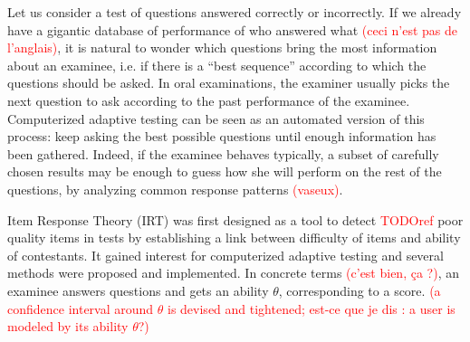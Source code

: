 \documentclass{sig-alternate}
\newcommand\alert[1]{\textcolor{red}{#1}}
\begin{document}
Let us consider a test of questions answered correctly or incorrectly. If we already have a gigantic database of performance of who answered what \alert{(ceci n'est pas de l'anglais)}, it is natural to wonder which questions bring the most information about an examinee, i.e. if there is a ``best sequence'' according to which the questions should be asked. In oral examinations, the examiner usually picks the next question to ask according to the past performance of the examinee. Computerized adaptive testing can be seen as an automated version of this process: keep asking the best possible questions until enough information has been gathered. Indeed, if the examinee behaves typically, a subset of carefully chosen results may be enough to guess how she will perform on the rest of the questions, by analyzing common response patterns \alert{(vaseux)}.

Item Response Theory (IRT) was first designed as a tool to detect \alert{TODOref} poor quality items in tests by establishing a link between difficulty of items and ability of contestants. It gained interest for computerized adaptive testing and several methods were proposed and implemented. In concrete terms \alert{(c'est bien, ça ?)}, an examinee answers questions and gets an ability $\theta$, corresponding to a score. \alert{(a confidence interval around $\theta$ is devised and tightened; est-ce que je dis : a user is modeled by its ability $\theta$?)}
\end{document}
